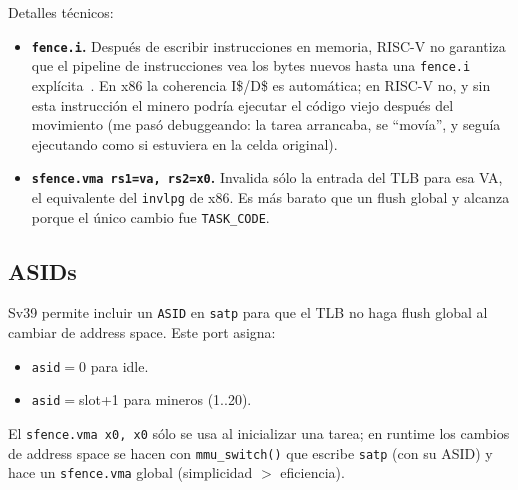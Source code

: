 Detalles técnicos:

\begin{itemize}
  \item \textbf{\texttt{fence.i}.} Después de escribir instrucciones en memoria, RISC-V no garantiza que el pipeline de
  instrucciones vea los bytes nuevos hasta una \texttt{fence.i} explícita~\cite{riscv-unpriv}. En x86 la coherencia
  I\$/D\$ es automática; en RISC-V no, y sin esta instrucción el minero podría ejecutar el código viejo después del
  movimiento (me pasó debuggeando: la tarea arrancaba, se ``movía'', y seguía ejecutando como si estuviera en la celda
  original).
  \item \textbf{\texttt{sfence.vma rs1=va, rs2=x0}.} Invalida sólo la entrada del TLB para esa VA, el equivalente del
  \texttt{invlpg} de x86. Es más barato que un flush global y alcanza porque el único cambio fue \texttt{TASK\_CODE}.
\end{itemize}

\subsection{ASIDs}

Sv39 permite incluir un \texttt{ASID} en \texttt{satp} para que el TLB no haga flush global al cambiar de address space.
Este port asigna:

\begin{itemize}
  \item \texttt{asid}$=$0 para idle.
  \item \texttt{asid}$=$slot+1 para mineros (1..20).
\end{itemize}

El \texttt{sfence.vma x0, x0} sólo se usa al inicializar una tarea; en runtime los cambios de address space se hacen con
\texttt{mmu\_switch()} que escribe \texttt{satp} (con su ASID) y hace un \texttt{sfence.vma} global (simplicidad $>$
eficiencia).
